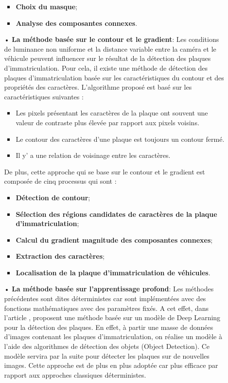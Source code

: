 \begin{enumerate}
\begin{itemize}
\begin{itemize}
                    \item \textbf{Choix du masque};
                    \item \textbf{Analyse des composantes connexes}.
                \end{itemize}
            \item[•] \textbf{La méthode basée sur le contour et le gradient}: Les conditions de luminance non uniforme et la distance variable entre la caméra et le véhicule peuvent
            influencer sur le résultat de la détection des plaques d’immatriculation. Pour cela, il existe une méthode
            de détection des plaques d’immatriculation basée sur les caractéristiques du contour et des propriétés des
            caractères. L’algorithme proposé est basé sur les caractéristiques suivantes :
                \begin{itemize}
                    \item Les pixels présentant les caractères de la plaque ont souvent une valeur de contraste plus élevée par rapport aux pixels voisins.
                    \item Le contour des caractères d’une plaque est toujours un contour fermé.
                    \item Il y’ a une relation de voisinage entre les caractères.
                \end{itemize}
            De plus, cette approche qui se base sur le contour et le gradient est composée de cinq processus qui sont :
                \begin{itemize}
                    \item \textbf{Détection de contour};
                    \item \textbf{Sélection des régions candidates de caractères de la plaque d’immatriculation};
                    \item \textbf{Calcul du gradient magnitude des composantes connexes};
                    \item \textbf{Extraction des caractères};
                    \item \textbf{Localisation de la plaque d’immatriculation de véhicules}.\cite{akacemMaster}
                \end{itemize}
            \item[•] \textbf{La méthode basée sur l’apprentissage profond}: Les méthodes précédentes sont dites déterministes car sont implémentées avec des fonctions mathématiques avec des paramètres fixés. A cet effet, dans l'article \cite{doi:10.1177/0361198120954202},  proposent une méthode basée sur un modèle de Deep Learning pour la détection des plaques. En effet, à partir une masse de données d’images contenant les plaques d’immatriculation, on réalise un modèle à l’aide des algorithmes de détection des objets (Object Detection). Ce modèle servira par la suite pour détecter les plaques sur de nouvelles images. Cette approche est de plus en plus adoptée car plus efficace par rapport aux approches classiques déterministes.

\end{itemize}
\end{enumerate}
